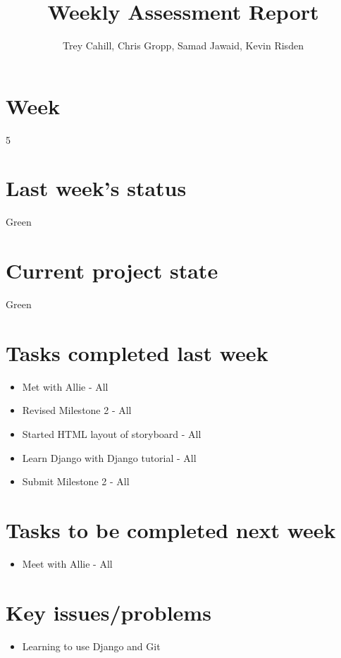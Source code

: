 \documentclass{article}
\title{Weekly Assessment Report}
\author{Trey Cahill, Chris Gropp, Samad Jawaid, Kevin Risden}
\begin{document}
\maketitle
\section{Week}
5
\section{Last week's status}
Green
\section{Current project state}
Green
\section{Tasks completed last week}
\begin{itemize}
\item Met with Allie - All
\item Revised Milestone 2 - All
\item Started HTML layout of storyboard - All
\item Learn Django with Django tutorial - All
\item Submit Milestone 2 - All
\end{itemize}
\section{Tasks to be completed next week}
\begin{itemize}
\item Meet with Allie - All
\end{itemize}
\section{Key issues/problems}
\begin{itemize}
\item Learning to use Django and Git
\end{itemize}
\end{document}
